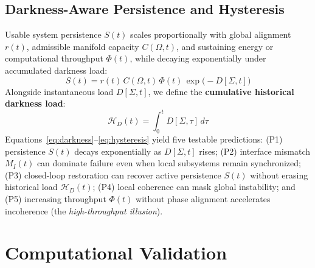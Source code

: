 \documentclass[11pt,twocolumn]{article}
\begin{document}
\subsection{Darkness-Aware Persistence and Hysteresis}
Usable system persistence $S(t)$ scales proportionally with global alignment $r(t)$, admissible manifold capacity $C(\Omega, t)$, and sustaining energy or computational throughput $\Phi(t)$, while decaying exponentially under accumulated darkness load:
\begin{equation}
S(t) = r(t) \, C(\Omega, t) \, \Phi(t) \, \exp\bigl(-D[\Sigma, t]\bigr)
\label{eq:persistence}
\end{equation}
Alongside instantaneous load $D[\Sigma, t]$, we define the \textbf{cumulative historical darkness load}:
\begin{equation}
\mathcal{H}_D(t) = \int_0^t D[\Sigma, \tau] \, d\tau
\label{eq:hysteresis}
\end{equation}
Equations~\eqref{eq:darkness}--\eqref{eq:hysteresis} yield five testable predictions: (P1) persistence $S(t)$ decays exponentially as $D[\Sigma, t]$ rises; (P2) interface mismatch $M_I(t)$ can dominate failure even when local subsystems remain synchronized; (P3) closed-loop restoration can recover active persistence $S(t)$ without erasing historical load $\mathcal{H}_D(t)$; (P4) local coherence can mask global instability; and (P5) increasing throughput $\Phi(t)$ without phase alignment accelerates incoherence (the \textit{high-throughput illusion}).

\section{Computational Validation}
\end{document}
